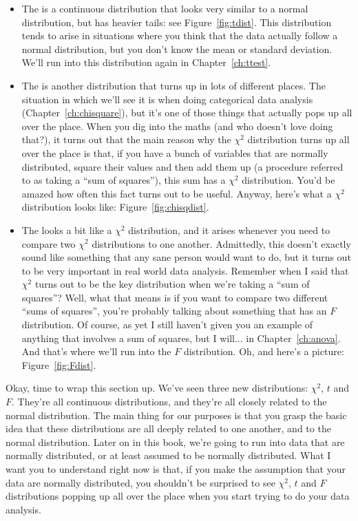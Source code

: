 \begin{itemize}
\item  The  is a continuous distribution that looks very similar to a normal distribution, but has heavier tails: see Figure~\ref{fig:tdist}. This distribution tends to arise in situations where you think that the data actually follow a normal distribution, but you don't know the mean or standard deviation. We'll run into this distribution again in Chapter~\ref{ch:ttest}. 

\item The  is another distribution that turns up in lots of different places. The situation in which we'll see it is when doing categorical data analysis (Chapter~\ref{ch:chisquare}), but it's one of those things that actually pops up all over the place. When you dig into the maths (and who doesn't love doing that?), it turns out that the main reason why the $\chi^2$ distribution turns up all over the place is that, if you have a bunch of variables that are normally distributed, square their values and then add them up (a procedure referred to as taking a ``sum of squares''), this sum has a $\chi^2$ distribution. You'd be amazed how often this fact turns out to be useful. Anyway, here's what a $\chi^2$ distribution looks like: Figure~\ref{fig:chisqdist}.  

\item The  looks a bit like a $\chi^2$ distribution, and it arises whenever you need to compare two $\chi^2$ distributions to one another. Admittedly, this doesn't exactly sound like something that any sane person would want to do, but it turns out to be very important in real world data analysis. Remember when I said that $\chi^2$ turns out to be the key distribution when we're taking a ``sum of squares''? Well, what that means is if you want to compare two different ``sums of squares'', you're probably talking about something that has an $F$ distribution. Of course, as yet I still haven't given you an example of anything that involves a sum of squares, but I will... in Chapter~\ref{ch:anova}. And that's where we'll run into the $F$ distribution. Oh, and here's a picture: Figure~\ref{fig:Fdist}. 

\end{itemize}

Okay, time to wrap this section up. We've seen three new distributions: $\chi^2$, $t$ and $F$. They're all continuous distributions, and they're all closely related to the normal distribution. The main thing for our purposes is that you grasp the basic idea that these distributions are all deeply related to one another, and to the normal distribution. Later on in this book, we're going to run into data that are normally distributed, or at least assumed to be normally distributed. What I want you to understand right now is that, if you make the assumption that your data are normally distributed, you shouldn't be surprised to see $\chi^2$, $t$ and $F$ distributions popping up all over the place when you start trying to do your data analysis. 




